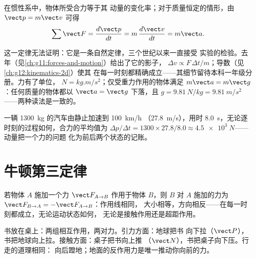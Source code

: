 \begin{theorem}[牛顿第二定律]\label{thm:g12:newtons-laws:second}
在惯性系中，物体所受合力等于其
动量的变化率；对于质量恒定的情形，由 $\vect p = m\vect v$ 可得
\[
\sum \vect F = \frac{d\vect p}{dt} = m\,\frac{d\vect v}{dt} = m \vect a .
\]
\end{theorem}
\admitted

\begin{remark}[自然定律及其单位]\label{rem:g12:newtons-laws:nature}
这一定律无法证明：它是一条自然定律，三个世纪以来一直接受
实验的检验。去年（见\cref{ch:g11:forces-and-motion}）给出了它的影子，
$\Delta v \propto F\,\Delta t/m$；导数（见\cref{ch:g12:kinematics-2d}）使其
在每一时刻都精确成立——其细节留待本科一年级分册。力有了单位，
$\unit{N} = \unit{kg.m/s^2}$；仅受重力作用的物体满足
$m\vect a = m\vect g$：任何质量的物体都以 $\vect a = \vect g$ 下落，且
$g = \qty{9.81}{N/kg} = \qty{9.81}{m/s^2}$——两种读法是一致的。
\end{remark}

\begin{example}\label{ex:g12:newtons-laws:average}
一辆 \qty{1300}{kg} 的汽车由静止加速到 \qty{100}{km/h}
（\qty{27.8}{m/s}），用时 \qty{8.0}{s}，无论逐时刻的过程如何，合力的平均值为
$\Delta p/\Delta t = 1300 \times 27.8/8.0 \approx \qty{4.5e3}{N}$——动量把一个力的问题
化为前后两个状态的记账。
\end{example}

\section{牛顿第三定律}

\begin{theorem}[牛顿第三定律]\label{thm:g12:newtons-laws:third}
若物体 $A$ 施加一个力 $\vect F_{A \to B}$ 作用于物体 $B$，则 $B$ 对
$A$ 施加的力为 $\vect F_{B \to A} = -\vect F_{A \to B}$：作用线相同，
大小相等，方向相反——在每一时刻都成立，无论运动状态如何，
无论是接触作用还是超距作用。
\end{theorem}
\admitted

\begin{example}[书、桌子与地球]\label{ex:g12:newtons-laws:book}
书放在桌上：两组相互作用，两对力。引力方面：地球把书
向下拉（$\vect P$），书把地球向上拉。接触方面：桌子把书向上推
（$\vect N$），书把桌子向下压。行走的道理相同：
向后蹬地；地面的反作用力是唯一推动你向前的力。
\end{example}

